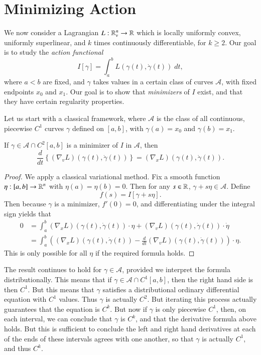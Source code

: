 \section{Minimizing Action}

We now consider a Lagrangian $L: \operatorname{\mathbb{R}}^n_v \to \operatorname{\mathbb{R}}$ which is locally uniformly convex, uniformly superlinear, and $k$ times continuously differentiable, for $k \geq 2$. Our goal is to study the \emph{action functional}
%
\[ I[\gamma] = \int_a^b L(\gamma(t), \dot{\gamma}(t))\; dt, \]
%
where $a < b$ are fixed, and $\gamma$ takes values in a certain class of curves $\mathcal{A}$, with fixed endpoints $x_0$ and $x_1$. Our goal is to show that \emph{minimizers} of $I$ exist, and that they have certain regularity properties.

Let us start with a classical framework, where $\mathcal{A}$ is the class of all continuous, piecewise $C^1$ curves $\gamma$ defined on $[a,b]$, with $\gamma(a) = x_0$ and $\gamma(b) = x_1$.

\begin{lemma}
    If $\gamma \in \mathcal{A} \cap C^2[a,b]$ is a minimizer of $I$ in $\mathcal{A}$, then
    \[ \frac{d}{dt} \left\{ (\nabla_v L)(\gamma(t), \dot{\gamma}(t)) \right\} = (\nabla_x L)(\gamma(t), \dot{\gamma}(t)). \]
\end{lemma}
\begin{proof}
    We apply a classical variational method. Fix a smooth function $\eta: [a,b] \to \operatorname{\mathbb{R}}^n$ with $\eta(a) = \eta(b) = 0$. Then for any $s \in \operatorname{\mathbb{R}}$, $\gamma + s \eta \in \mathcal{A}$. Define
    \[ f(s) = I[\gamma + s \eta]. \]
    Then because $\gamma$ is a minimizer, $f'(0) = 0$, and differentiating under the integral sign yields that
    \begin{align*}
        0 &= \int_a^b (\nabla_x L)(\gamma(t), \dot{\gamma}(t)) \cdot \eta + (\nabla_v L)(\gamma(t), \dot{\gamma}(t)) \cdot \dot{\eta}\\
        &= \int_a^b \left( (\nabla_x L)(\gamma(t), \dot{\gamma}(t)) - \frac{d}{dt} (\nabla_v L)(\gamma(t), \dot{\gamma}(t)) \right) \cdot \eta.
    \end{align*}
    This is only possible for all $\eta$ if the required formula holds.
\end{proof}

The result continues to hold for $\gamma \in \mathcal{A}$, provided we interpret the formula distributionally. This means that if $\gamma \in \mathcal{A} \cap C^1[a,b]$, then the right hand side is then $C^1$. But this means that $\gamma$ satisfies a distributional ordinary differential equation with $C^1$ values. Thus $\gamma$ is actually $C^2$. But iterating this process actually guarantees that the equation is $C^k$. But now if $\gamma$ is only piecewise $C^1$, then, on each interval, we can conclude that $\gamma$ is $C^k$, and that the derivative formula above holds. But this is sufficient to conclude the left and right hand derivatives at each of the ends of these intervals agrees with one another, so that $\gamma$ is actually $C^1$, and thus $C^k$.

